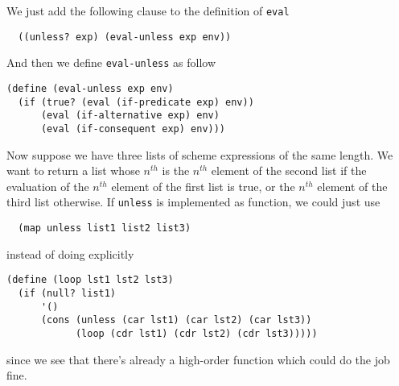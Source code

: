 \documentclass[a4paper,12pt]{article}
\begin{document}
We just add the following clause to the definition of \lstinline!eval!

\begin{lstlisting}
  ((unless? exp) (eval-unless exp env))
\end{lstlisting}

And then we define \lstinline!eval-unless! as follow

\begin{lstlisting}
(define (eval-unless exp env)
  (if (true? (eval (if-predicate exp) env))
      (eval (if-alternative exp) env)
      (eval (if-consequent exp) env)))
\end{lstlisting}

Now suppose we have three lists of scheme expressions of the same
length.  We want to return a list whose $n^{th}$ is the $n^{th}$
element of the second list if the evaluation of the $n^{th}$ element
of the first list is true, or the $n^{th}$ element of the third list
otherwise.  If \lstinline!unless! is implemented as function, we could
just use

\begin{lstlisting}
  (map unless list1 list2 list3)
\end{lstlisting}

instead of doing explicitly

\begin{lstlisting}
(define (loop lst1 lst2 lst3)
  (if (null? list1)
      '()
      (cons (unless (car lst1) (car lst2) (car lst3))
            (loop (cdr lst1) (cdr lst2) (cdr lst3)))))
\end{lstlisting}

since we see that there's already a high-order function which could do
the job fine.
\end{document}
